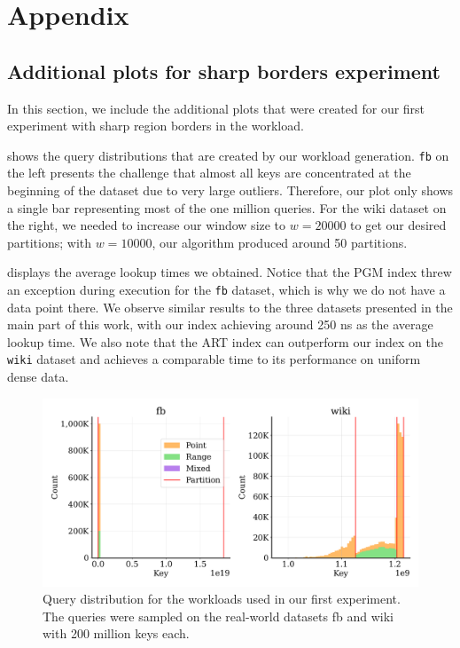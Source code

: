 \chapter{Appendix}


\section{Additional plots for sharp borders experiment}\label{app:sharp}
In this section, we include the additional plots that were created for our first experiment with sharp region borders in the workload. \par 

 shows the query distributions that are created by our workload generation. \verb|fb| on the left presents the challenge that almost all keys are concentrated at the beginning of the dataset due to very large outliers. Therefore, our plot only shows a single bar representing most of the one million queries. For the wiki dataset on the right, we needed to increase our window size to $w = 20000$ to get our desired partitions; with $w = 10000$, our algorithm produced around 50 partitions.

 displays the average lookup times we obtained. Notice that the PGM index threw an exception during execution for the \verb|fb| dataset, which is why we do not have a data point there. We observe similar results to the three datasets presented in the main part of this work, with our index achieving around 250 ns as the average lookup time. We also note that the ART index can outperform our index on the \verb|wiki| dataset and achieves a comparable time to its performance on uniform dense data.


\begin{figure}
    \centering
    \includegraphics[width=\textwidth]{figures/app_exp1_query_dist.pdf}
    \caption[fb and wiki query distribution after sharp boundary sampling]{Query distribution for the workloads used in our first experiment. The queries were sampled on the real-world datasets fb and wiki with 200 million keys each.}
    \label{fig:app_exp1_query_dist}
\end{figure}

